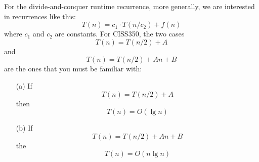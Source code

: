 \begin{comment}
%        
%
%
\newpage
\begin{ex}
  \begin{tightlist}
    \item
    Let
    \[
    T(n) = T(\floor{n/2}) + T(n - \floor{n/2}) + n
    \]
    and $T(n) = 1$ if $n \leq 1$.
    Compute (by hand) and
    write down the table for $T(n)$ for $n = 0, 1, 2, ..., 9$.
    \item
    Let
    \[
    T'(n) = 2T'(n/2) + n
    \]
    and $T'(n) = 1$ if $n \leq 1$.
    Compute (by hand) and
    write down the table for $T'(n)$ for $n = 0, 1, 2, ..., 9$.
    \item
    Plot more values for $T(n)$ and $T'(n)$ ... as in \textit{lots} of $n$'s.
    Can you find good approximation for $T(n)$?
    (Here good mean functions such as $n^\alpha$, $\ln^\alpha n$,
    $n^\alpha \ln^\beta n$, $c^n$, etc.
  You'll see that asymptotically (when $n$ is large),
  $T(n)$ and $T'(n)$ are about the same.
  \end{tightlist}
  \qed
\end{ex}

The above experiments will show you that for our recurrences,
asymptotically (when $n$ is large),
it doesn't matter if $n/2$ is replaced by $\floor{n/2}$ or
$\ceiling{n/2}$ or
when $n - \floor{n/2}$ or $n - \ceiling{n/2}$ is replaced by
$n/2$.

\end{comment}

For the divide-and-conquer runtime recurrence,
more generally, we are interested in recurrences like this:
\[
T(n) = c_1 \cdot T(n/c_2) + f(n)
\]
where $c_1$ and $c_2$ are constants.
For CISS350, 
the two cases 
\[
T(n) = T(n/2) + A
\]
and
\[
T(n) = T(n/2) + An + B 
\]
are the ones that you must be familiar with:

\begin{thm}
  \mbox{}
  \begin{enumerate}[nosep]
  \item[\textnormal{(a)}] If \[
    T(n) = T(n/2) + A
    \]
    then
    \[
    T(n) = O(\lg n)
    \]
  \item[\textnormal{(b)}]
    If
    \[
    T(n) = T(n/2) + An + B 
    \]
    the
    \[
    T(n) = O(n \lg n)
    \]
  \end{enumerate}
\end{thm}

